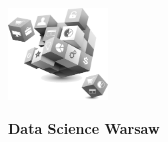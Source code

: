 \documentclass[\main/boa.tex]{subfiles}
\begin{document}
	
	\begin{minipage}[t]{0.915\textwidth}
		\center     
		\includegraphics[width=100px]{img/logos.bw/DSW_transparent.png} 
	\end{minipage}
	
	\Large \textbf {Data Science Warsaw}
	
	
	\vskip 0.3cm
	\normalsize 

	\vskip 1.5cm
\end{document}
